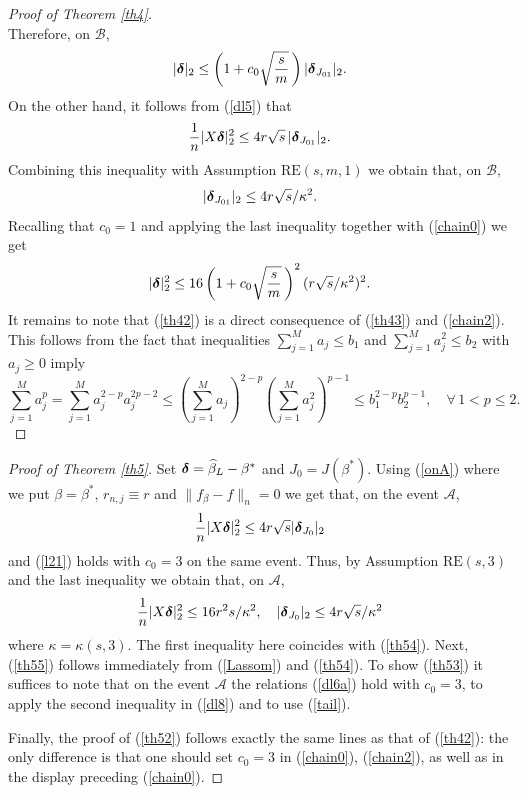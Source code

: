 \documentclass[dvips,aos]{imsart}
\numberwithin{equation}{section}
\theoremstyle{plain}
\def\sf{}
\def\A{\mbox{$\mathcal A$}}
\def\B{\mbox{$\mathcal B$}}
\def\RE#1#2{$\text{RE}(#1,#2)$}
\def\REm#1#2#3{$\text{RE}(#1,#2,#3)$}
\newcommand{\bD}{\mbox{\boldmath$\delta$}}
\newcommand{\bb}{\mbox{\boldmath$\beta$}}
\def\bb{\beta}
\begin{document}
\begin{proof}[Proof of Theorem \ref{th4}]
$$$$
Therefore, on $\B$,
\begin{equation}\label{chain0}
|\bD|_2\le \left(1+c_0\sqrt{\frac{s}{m}}\,\right)|\bD_{J_{01}}|_2.
\end{equation}
On the other hand, it follows from (\ref{dl5}) that
$$
\frac{1}{n}|X \bD|_2^2 \le 4 r \sqrt{s}\,|\bD_{J_{01}}|_2.
$$
Combining this inequality with Assumption \REm sm1 we obtain
that, on $\B$,
\begin{eqnarray*}
|\bD_{J_{01}}|_2 \le 4 r \sqrt{s}/\kappa^2.
\end{eqnarray*}
Recalling that $c_0=1$ and applying the last inequality together
with (\ref{chain0}) we get
\begin{equation}\label{chain2}
|\bD|_2^2\le 16 \left(1+c_0\sqrt{\frac{s}{m}}\,\right)^2 (r\sqrt{
s}/\kappa^2)^2.
\end{equation}
It remains to note that (\ref{th42}) is a direct consequence of
(\ref{th43}) and (\ref{chain2}). This follows from the fact that
inequalities $\sum_{j=1}^M a_j\le b_1$ and $\sum_{j=1}^M a_j^2\le
b_2$ with $a_j\ge0$ imply
$$
\sum_{j=1}^M a_j^p = \sum_{j=1}^M a_j^{2-p} a_j^{2p-2} \le
\left(\sum_{j=1}^M a_j\right)^{2-p}\left(\sum_{j=1}^M
a_j^2\right)^{p-1} \le b_1^{2-p} b_2^{p-1},\quad \forall \, 1<p\le
2.
$$

\end{proof}




\begin{proof}[Proof of Theorem \ref{th5}] Set $\bD=\widehat\bb_L-\bb^*$ and
$J_0=J(\bb^*)$. Using (\ref{onA}) where we put $\beta=\bb^*$,
$r_{n,j}\equiv r$ and $\|{\sf f}_\beta -f\|_n= 0$ we get that, on
the event $\A$,
\begin{equation}\begin{split}\label{dl8a}
\frac{1}{n}|X \bD|_2^2 \le 4r\sqrt{s}|\bD_{J_0}|_2
\end{split}\end{equation}
and (\ref{l21}) holds with $c_0=3$
on the same event. Thus, by Assumption \RE s3 and the last
inequality we obtain that, on $\A$,
\begin{equation}\begin{split}\label{dl8}  \frac{1}{n}|X \bD|_2^2 \le
16r^2 s/\kappa^2, \quad|\bD_{J_{0}}|_2\le 4r\sqrt{s}/\kappa^2
\end{split}\end{equation}
where $\kappa=\kappa(s,3)$. The first inequality here coincides with
(\ref{th54}). Next, (\ref{th55}) follows immediately from
(\ref{Lassom}) and (\ref{th54}). To show (\ref{th53}) it suffices to
note that on the event $\A$ the relations (\ref{dl6a}) hold with
$c_0=3$, to apply the second inequality in (\ref{dl8}) and to use
(\ref{tail}).

Finally, the proof of (\ref{th52}) follows exactly the same lines as
that of (\ref{th42}): the only difference is that one should set
$c_0=3$ in (\ref{chain0}), (\ref{chain2}), as well as in the display
preceding (\ref{chain0}).

\end{proof}
\end{document}
